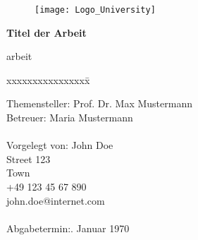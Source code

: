 \begin{titlepage}
  \begin{centering}
  \begin{figure}[h!]
    \centering
    \texttt{[image: Logo\_University]}
  \end{figure}


  
  \vspace*{0.4cm}

  \textsf{\Huge \textbf{Titel der Arbeit\\}}

  \vspace*{0.5cm}
  arbeit\\

  \end{centering}

  \vspace*{1.5cm}
  \begin{tabbing}
  xxxxxxxxxxxxxxxx\= \kill

  \small Themensteller:\> Prof. Dr. Max Mustermann\\
  \small Betreuer:\> Maria Mustermann\\\\

  \small Vorgelegt von: \>John Doe\\
  \small \>Street 123\\
  \small {} Town\\
  \small \>+49 123 45 67 890\\
  \small \>john.doe@internet.com\\\\

  \small Abgabetermin:. Januar 1970
  \end{tabbing}
\end{titlepage}
\newpage
